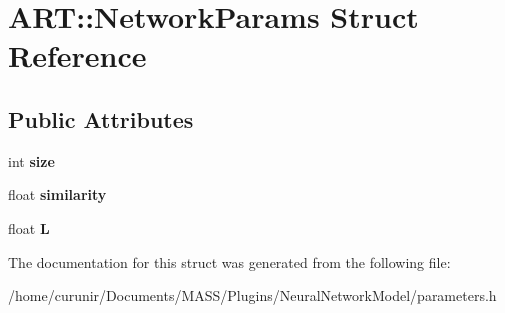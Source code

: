 \hypertarget{struct_a_r_t_1_1_network_params}{}\section{A\+RT\+:\+:Network\+Params Struct Reference}
\label{struct_a_r_t_1_1_network_params}
\subsection*{Public Attributes}
\begin{DoxyCompactItemize}
\item 
int {\bfseries size}\hypertarget{struct_a_r_t_1_1_network_params_aababa990b5d0e5d080003e52bc8347a2}{}\label{struct_a_r_t_1_1_network_params_aababa990b5d0e5d080003e52bc8347a2}

\item 
float {\bfseries similarity}\hypertarget{struct_a_r_t_1_1_network_params_ac985741814be043af5c083d3fb6cb44a}{}\label{struct_a_r_t_1_1_network_params_ac985741814be043af5c083d3fb6cb44a}

\item 
float {\bfseries L}\hypertarget{struct_a_r_t_1_1_network_params_a2bd0fa378b49bddad207de236a7292d9}{}\label{struct_a_r_t_1_1_network_params_a2bd0fa378b49bddad207de236a7292d9}

\end{DoxyCompactItemize}


The documentation for this struct was generated from the following file\+:\begin{DoxyCompactItemize}
\item 
/home/curunir/\+Documents/\+M\+A\+S\+S/\+Plugins/\+Neural\+Network\+Model/parameters.\+h\end{DoxyCompactItemize}
